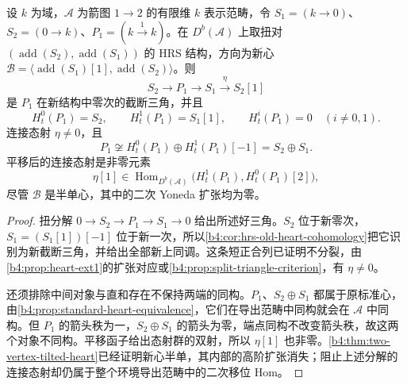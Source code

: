 \begin{proposition}\label{b4:prop:two-vertex-postnikov-nonsplit}
	设 \(k\) 为域，\(\mathcal A\) 为箭图 \(1\to2\) 的有限维 \(k\) 表示范畴，令 \(S_1=(k\to0)\)、\(S_2=(0\to k)\)、\(P_1=(k\xrightarrow{1}k)\)。在 \(D^b(\mathcal A)\) 上取扭对 \((\operatorname{add}(S_2),\operatorname{add}(S_1))\) 的 HRS 结构，方向为新心 \(\mathcal B=\langle\operatorname{add}(S_1)[1],\operatorname{add}(S_2)\rangle\)。则
	\[
		S_2\longrightarrow P_1\longrightarrow S_1 \xrightarrow{\eta}S_2[1]
	\]
	是 \(P_1\) 在新结构中零次的截断三角，并且
	\[
		H_t^0(P_1)=S_2,\qquad H_t^1(P_1)=S_1[1],\qquad H_t^i(P_1)=0\quad(i\ne0,1).
	\]
	连接态射 \(\eta\ne0\)，且
	\[
		P_1\not\cong H_t^0(P_1)\oplus H_t^1(P_1)[-1] =S_2\oplus S_1.
	\]
	平移后的连接态射是非零元素
	\[
		\eta[1]\in\operatorname{Hom}_{D^b(\mathcal A)} \bigl(H_t^1(P_1),H_t^0(P_1)[2]\bigr),
	\]
	尽管 \(\mathcal B\) 是半单心，其中的二次 Yoneda 扩张均为零。
\end{proposition}
\begin{proof}
	扭分解 \(0\to S_2\to P_1\to S_1\to0\) 给出所述好三角。\(S_2\) 位于新零次，\(S_1=(S_1[1])[-1]\) 位于新一次，所以\cref{b4:cor:hrs-old-heart-cohomology}把它识别为新截断三角，并给出全部新上同调。这条短正合列已证明不分裂，由\cref{b4:prop:heart-ext1}的扩张对应或\cref{b4:prop:split-triangle-criterion}，有 \(\eta\ne0\)。

	还须排除中间对象与直和存在不保持两端的同构。\(P_1\)、\(S_2\oplus S_1\) 都属于原标准心，由\cref{b4:prop:standard-heart-equivalence}，它们在导出范畴中同构就会在 \(\mathcal A\) 中同构。但 \(P_1\) 的箭头秩为一，\(S_2\oplus S_1\) 的箭头为零，端点同构不改变箭头秩，故这两个对象不同构。平移函子给出态射群的双射，所以 \(\eta[1]\) 也非零。\cref{b4:thm:two-vertex-tilted-heart}已经证明新心半单，其内部的高阶扩张消失；阻止上述分解的连接态射却仍属于整个环境导出范畴中的二次移位 Hom。
\end{proof}
